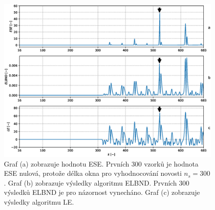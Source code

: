 \begin{figure}[!ht]
    \centering
    \includegraphics[scale=0.56]{IMG/mdpi/mackey_results_nd.eps}
    \caption{Graf (a) zobrazuje hodnotu ESE. Prvních 300 vzorků je hodnota ESE nulová, protože délka okna pro vyhodnocování novosti $n_s=300$. Graf (b) zobrazuje výsledky algoritmu ELBND. Prvních 300 výsledků ELBND je pro názornost vynecháno. Graf (c) zobrazuje výsledky algoritmu LE.}
    \label{fig:mackey_results_nd}
\end{figure}

